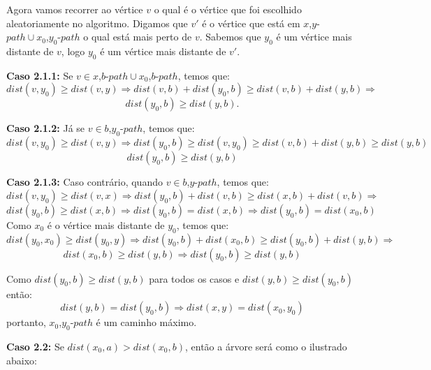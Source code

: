 \documentclass[a4paper,12pt]{article}
\begin{document}
\begin{itemize}
			Agora vamos recorrer ao vértice $v$ o qual é o vértice
			que foi escolhido aleatoriamente no algoritmo.
			Digamos que $v'$ é o vértice que está em
			$x$,$y$-$path\cup x_0$,$y_0$-$path$ o qual está mais
			perto de $v$.
			Sabemos que $y_0$ é um vértice mais distante de $v$,
			logo $y_0$ é um vértice mais distante de $v'$. 
			
			\textbf{Caso 2.1.1:} Se 
			$v\in x$,$b$-$path\cup x_0$,$b$-$path$, temos que:
			$$ dist(v,y_0)\ge dist(v,y) \Rightarrow
			dist(v,b)+dist(y_0,b)\ge dist(v,b) + dist(y,b) 
			\Rightarrow$$
			$$ dist(y_0,b)\ge dist(y,b).$$

			\textbf{Caso 2.1.2:} Já se $v\in b$,$y_0$-$path$, 
			temos que:
			$$ dist(v,y_0)\ge dist(v,y) \Rightarrow
			dist(y_0,b)\ge dist(v,y_0)\ge 
			dist(v,b) + dist(y,b)\ge dist(y,b) $$
			$$ dist(y_0,b)\ge dist(y,b) $$

			\textbf{Caso 2.1.3:} Caso contrário, quando 
			$v\in b$,$y$-$path$, temos que:
			$$ dist(v,y_0)\ge dist(v,x) \Rightarrow
			dist(y_0,b)+dist(v,b)\ge dist(x,b)+dist(v,b)
			\Rightarrow $$
			$$ dist(y_0,b)\ge dist(x,b) \Rightarrow
			dist(y_0,b) = dist(x,b) \Rightarrow 
			dist(y_0,b) = dist(x_0,b) $$
			Como  $x_0$ é o vértice mais distante de $y_0$, temos
			que:
			$$ dist(y_0,x_0)\ge dist(y_0,y) \Rightarrow
			dist(y_0,b) + dist(x_0,b)\ge dist(y_0,b) + dist(y,b)
			\Rightarrow $$
			$$ dist(x_0,b)\ge dist(y,b) \Rightarrow 
			dist(y_0,b)\ge dist(y,b) $$

			\bigskip

			Como $dist(y_0,b)\ge dist(y,b)$ para todos os casos
			e $dist(y,b)\ge dist(y_0,b)$ então:
			$$ dist(y,b) =  dist(y_0,b) \Rightarrow
			dist(x,y) = dist(x_0,y_0) $$
			portanto, $x_0$,$y_0$-$path$ é um caminho máximo.

			\bigskip
			\bigskip

			\textbf{Caso 2.2:} Se $dist(x_0,a)> dist(x_0,b)$,
			então a árvore será como o ilustrado abaixo:

\end{itemize}
\end{document}
